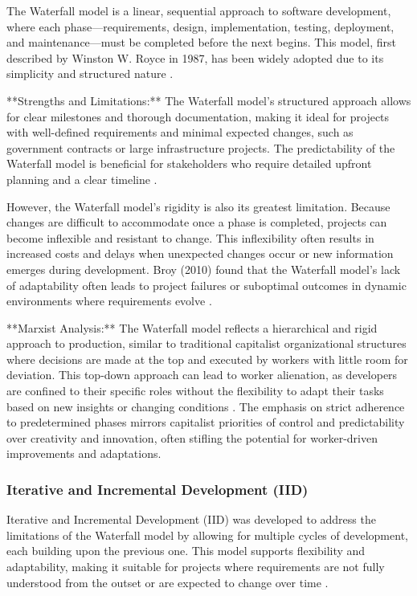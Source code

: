 \begin{refsection}
The Waterfall model is a linear, sequential approach to software development, where each phase—requirements, design, implementation, testing, deployment, and maintenance—must be completed before the next begins. This model, first described by Winston W. Royce in 1987, has been widely adopted due to its simplicity and structured nature \cite[pp.~329-341]{royce1987managing}.

**Strengths and Limitations:** The Waterfall model’s structured approach allows for clear milestones and thorough documentation, making it ideal for projects with well-defined requirements and minimal expected changes, such as government contracts or large infrastructure projects. The predictability of the Waterfall model is beneficial for stakeholders who require detailed upfront planning and a clear timeline \cite[pp.~12-30]{bass2021software}.

However, the Waterfall model's rigidity is also its greatest limitation. Because changes are difficult to accommodate once a phase is completed, projects can become inflexible and resistant to change. This inflexibility often results in increased costs and delays when unexpected changes occur or new information emerges during development. Broy (2010) found that the Waterfall model's lack of adaptability often leads to project failures or suboptimal outcomes in dynamic environments where requirements evolve \cite[pp.~23-45]{broy2010requirements}.

**Marxist Analysis:** The Waterfall model reflects a hierarchical and rigid approach to production, similar to traditional capitalist organizational structures where decisions are made at the top and executed by workers with little room for deviation. This top-down approach can lead to worker alienation, as developers are confined to their specific roles without the flexibility to adapt their tasks based on new insights or changing conditions \cite[pp.~18-40]{braverman1998labor}. The emphasis on strict adherence to predetermined phases mirrors capitalist priorities of control and predictability over creativity and innovation, often stifling the potential for worker-driven improvements and adaptations.

\subsubsection{Iterative and Incremental Development (IID)}

Iterative and Incremental Development (IID) was developed to address the limitations of the Waterfall model by allowing for multiple cycles of development, each building upon the previous one. This model supports flexibility and adaptability, making it suitable for projects where requirements are not fully understood from the outset or are expected to change over time \cite[pp.~116-140]{sommerville2016software}.


\end{refsection}
